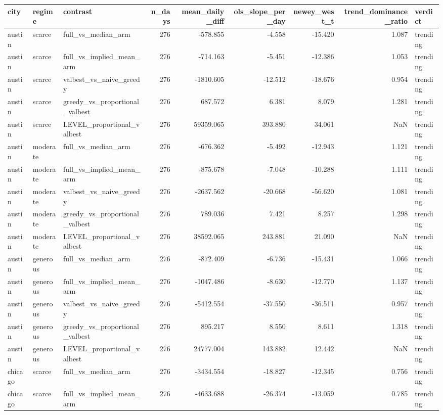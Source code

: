\begin{tabular}{lllrrrrrl}
\toprule
city & regime & contrast & n\_days & mean\_daily\_diff & ols\_slope\_per\_day & newey\_west\_t & trend\_dominance\_ratio & verdict \\
\midrule
austin & scarce & full\_vs\_median\_arm & 276 & -578.855 & -4.558 & -15.420 & 1.087 & trending \\
austin & scarce & full\_vs\_implied\_mean\_arm & 276 & -714.163 & -5.451 & -12.386 & 1.053 & trending \\
austin & scarce & valbest\_vs\_naive\_greedy & 276 & -1810.605 & -12.512 & -18.676 & 0.954 & trending \\
austin & scarce & greedy\_vs\_proportional\_valbest & 276 & 687.572 & 6.381 & 8.079 & 1.281 & trending \\
austin & scarce & LEVEL\_proportional\_valbest & 276 & 59359.065 & 393.880 & 34.061 & NaN & trending \\
austin & moderate & full\_vs\_median\_arm & 276 & -676.362 & -5.492 & -12.943 & 1.121 & trending \\
austin & moderate & full\_vs\_implied\_mean\_arm & 276 & -875.678 & -7.048 & -10.288 & 1.111 & trending \\
austin & moderate & valbest\_vs\_naive\_greedy & 276 & -2637.562 & -20.668 & -56.620 & 1.081 & trending \\
austin & moderate & greedy\_vs\_proportional\_valbest & 276 & 789.036 & 7.421 & 8.257 & 1.298 & trending \\
austin & moderate & LEVEL\_proportional\_valbest & 276 & 38592.065 & 243.881 & 21.090 & NaN & trending \\
austin & generous & full\_vs\_median\_arm & 276 & -872.409 & -6.736 & -15.431 & 1.066 & trending \\
austin & generous & full\_vs\_implied\_mean\_arm & 276 & -1047.486 & -8.630 & -12.770 & 1.137 & trending \\
austin & generous & valbest\_vs\_naive\_greedy & 276 & -5412.554 & -37.550 & -36.511 & 0.957 & trending \\
austin & generous & greedy\_vs\_proportional\_valbest & 276 & 895.217 & 8.550 & 8.611 & 1.318 & trending \\
austin & generous & LEVEL\_proportional\_valbest & 276 & 24777.004 & 143.882 & 12.442 & NaN & trending \\
chicago & scarce & full\_vs\_median\_arm & 276 & -3434.554 & -18.827 & -12.345 & 0.756 & trending \\
chicago & scarce & full\_vs\_implied\_mean\_arm & 276 & -4633.688 & -26.374 & -13.059 & 0.785 & trending \\

\end{tabular}
